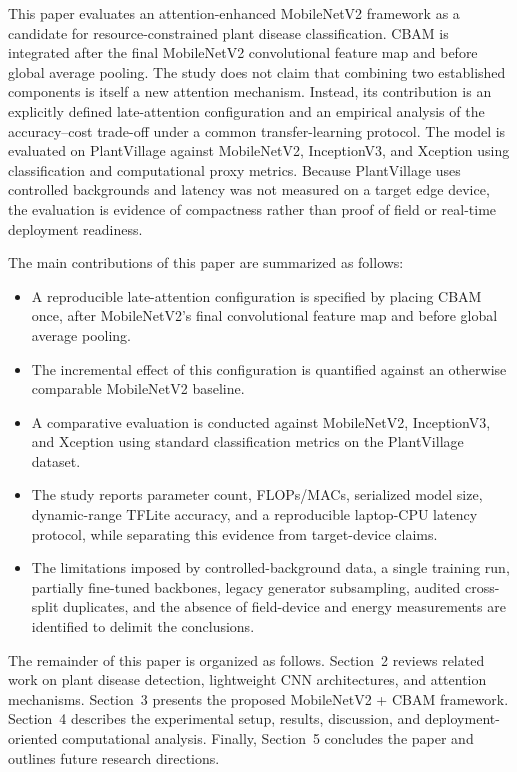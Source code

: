 This paper evaluates an attention-enhanced MobileNetV2 framework as a candidate for resource-constrained plant disease classification. CBAM is integrated after the final MobileNetV2 convolutional feature map and before global average pooling. The study does not claim that combining two established components is itself a new attention mechanism. Instead, its contribution is an explicitly defined late-attention configuration and an empirical analysis of the accuracy--cost trade-off under a common transfer-learning protocol. The model is evaluated on PlantVillage against MobileNetV2, InceptionV3, and Xception using classification and computational proxy metrics. Because PlantVillage uses controlled backgrounds and latency was not measured on a target edge device, the evaluation is evidence of compactness rather than proof of field or real-time deployment readiness.

The main contributions of this paper are summarized as follows:

\begin{itemize}
    \item A reproducible late-attention configuration is specified by placing CBAM once, after MobileNetV2's final convolutional feature map and before global average pooling.
    
    \item The incremental effect of this configuration is quantified against an otherwise comparable MobileNetV2 baseline.
    
    \item A comparative evaluation is conducted against MobileNetV2, InceptionV3, and Xception using standard classification metrics on the PlantVillage dataset.
    
    \item The study reports parameter count, FLOPs/MACs, serialized model size, dynamic-range TFLite accuracy, and a reproducible laptop-CPU latency protocol, while separating this evidence from target-device claims.
    
    \item The limitations imposed by controlled-background data, a single training run, partially fine-tuned backbones, legacy generator subsampling, audited cross-split duplicates, and the absence of field-device and energy measurements are identified to delimit the conclusions.
\end{itemize}

The remainder of this paper is organized as follows. Section~2 reviews related work on plant disease detection, lightweight CNN architectures, and attention mechanisms. Section~3 presents the proposed MobileNetV2 + CBAM framework. Section~4 describes the experimental setup, results, discussion, and deployment-oriented computational analysis. Finally, Section~5 concludes the paper and outlines future research directions.
